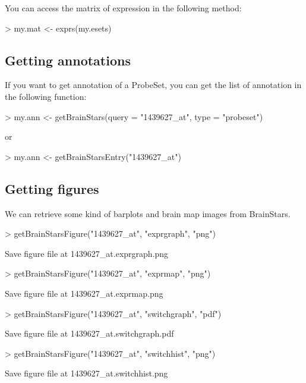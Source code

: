 \documentclass[12pt,fullpage]{article}
\begin{document}
You can access the matrix of expression in the following method:
\begin{Schunk}
\begin{Sinput}
> my.mat <- exprs(my.esets)
\end{Sinput}
\end{Schunk}

\subsection{Getting annotations}
If you want to get annotation of a ProbeSet, you can get the list of annotation in the following function:
\begin{Schunk}
\begin{Sinput}
> my.ann <- getBrainStars(query = "1439627_at", type = "probeset")
\end{Sinput}
\end{Schunk}
or 
\begin{Schunk}
\begin{Sinput}
> my.ann <- getBrainStarsEntry("1439627_at")
\end{Sinput}
\end{Schunk}

\subsection{Getting figures}
We can retrieve some kind of barplots and brain map images from BrainStars.

\begin{Schunk}
\begin{Sinput}
> getBrainStarsFigure("1439627_at", "exprgraph",   "png")
\end{Sinput}
\begin{Soutput}
Save figure file at 1439627_at.exprgraph.png 
\end{Soutput}
\begin{Sinput}
> getBrainStarsFigure("1439627_at", "exprmap",     "png")
\end{Sinput}
\begin{Soutput}
Save figure file at 1439627_at.exprmap.png 
\end{Soutput}
\begin{Sinput}
> getBrainStarsFigure("1439627_at", "switchgraph", "pdf")
\end{Sinput}
\begin{Soutput}
Save figure file at 1439627_at.switchgraph.pdf 
\end{Soutput}
\begin{Sinput}
> getBrainStarsFigure("1439627_at", "switchhist",  "png")
\end{Sinput}
\begin{Soutput}
Save figure file at 1439627_at.switchhist.png 
\end{Soutput}
\end{Schunk}
\end{document}
